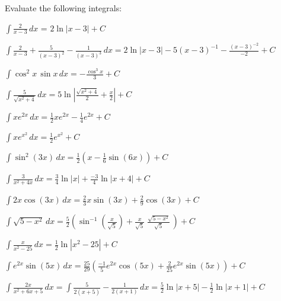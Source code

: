 \documentclass[12pt]{exam}
\begin{document}
Evaluate the following integrals:
\begin{questions}
\question  $\displaystyle \int \frac{2}{x-3}    \, dx$ = $2\ln|x-3| +C$ 
\vspace{.35in}

\question $\displaystyle \int \frac{2}{x-3} + \frac {5}{(x-3)^2} 
- \frac{1}{(x-3)^3}    \, dx = 2\ln|x-3| -5(x-3)^{-1}
-\frac{(x-3)^{-2}}{-2}+C$
\vspace{.35in}

\question $\displaystyle \int  \cos^2 x \, \sin x \, dx = -\frac{\cos^3 x}{3}+C$
\vspace{.35in}

\question $\displaystyle \int \frac{5}{\sqrt{x^2 +4}} \, dx = 5\ln\left|
\frac{\sqrt{x^2+4}}{2} + \frac{x}{2}\right| +C$
\vspace{.35in}

\question $\int x e^{2x} \, dx = \frac{1}{2} xe^{2x} -\frac{1}{4}e^{2x}+C$
\vspace{.35in}

\question $\int x e^{x^2} \, dx =\frac{1}{2} e^{x^2}+C$
\vspace{.35in}


\question $\int \sin^2(3x)\, dx =\frac{1}{2}\left(x-\frac{1}{6}\sin(6x)\right)+C$
\vspace{.35in}

\question $\displaystyle \int  \frac{3}{x^2+4x} \, dx = \frac{3}{4}\ln|x|
+\frac{-3}{4}\ln|x+4|+C$
\vspace{.35in}

\question $\displaystyle \int  2x\cos(3x) \, dx =\frac{2}{3}x\sin(3x) +
\frac{2}{9}\cos(3x)+C$
\vspace{.25in}

\question $\displaystyle \int   \sqrt{5-x^2} \, dx=\frac{5}{2}\left(
\sin^{-1}\left(\frac{x}{\sqrt{5}}\right) + \frac{x}{\sqrt{5}}\;\frac{\sqrt{5-x^2}}
{\sqrt{5}}\,\right)+C$
\vspace{.25in}

\question $\displaystyle \int \frac{x}{x^2-25}\, dx=\frac{1}{2}\ln|x^2-25|+C$
\vspace{.35in}

\question $\displaystyle \int e^{2x} \sin(5x)\, dx =
\frac{25}{29}\left(\frac{-1}{5}e^{2x}\cos(5x)+\frac{2}{25}e^{2x}\sin(5x)
\right)+C$
\vspace{.25in}

\question $\displaystyle \int   \frac{2x}{x^2+6x+5}\, dx = \int \frac{5}{2(x+5)}-
\frac{1}{2(x+1)}\, dx = \frac{5}{2}\ln|x+5| -\frac{1}{2}\ln|x+1|+C$
\vspace{.35in}


\end{questions}
\end{document}
